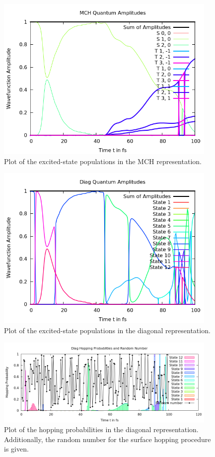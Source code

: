 \documentclass[a4paper,11pt,DIV=15,openany]{scrbook}
\begin{document}
\begin{figure}[p]
  \centering
  \includegraphics[width=0.95\textwidth]{figures/coeff_MCH.png}
  \caption{Plot of the excited-state populations in the MCH representation.}
  \label{fig:cMCH}
\end{figure}
\begin{figure}[p]
  \centering
  \includegraphics[width=0.95\textwidth]{figures/coeff_diag.png}
  \caption{Plot of the excited-state populations in the diagonal representation.}
  \label{fig:cDIAG}
\end{figure}
\begin{figure}[p]
  \centering
  \includegraphics[width=0.95\textwidth]{figures/prob.png}
  \caption{Plot of the hopping probabilities in the diagonal representation. Additionally, the random number for the surface hopping procedure is given.}
  \label{fig:prob}
\end{figure}
\end{document}
